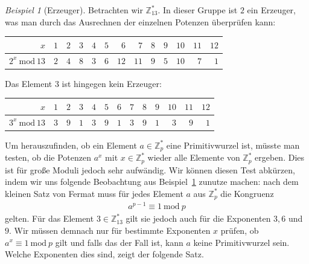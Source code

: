 \documentclass[
  a4paper,
  11pt,
]{scrartcl}
\theoremstyle{plain}
\theoremstyle{definition}
\theoremstyle{remark}
\newtheorem{beispiel}{Beispiel}
\newcommand{\Z}{\mathbb{Z}}
\newcommand{\Mod}[1]{\ \mathrm{mod}\ #1}
\begin{document}
\begin{beispiel}[Erzeuger]\label{bsp:erzeuger}
  Betrachten wir $\Z_{13}^*$. In dieser Gruppe ist $2$ ein Erzeuger, was man
  durch das Ausrechnen der einzelnen Potenzen überprüfen kann:
  \begin{center}
    \begin{tabular}{r*{12}{r}}
      \toprule
      $x$ & $1$ & $2$ & $3$ & $4$ & $5$ & $6$ & $7$ & $8$ & $9$ & $10$ & $11$ & $12$\\
      \midrule
      $2^x \Mod{13}$ & $2$ & $4$ & $8$ & $3$ & $6$ & $12$ & $11$ & $9$ & $5$ & $10$ & $7$ & $1$\\
      \bottomrule
    \end{tabular}
  \end{center}
  Das Element $3$ ist hingegen kein Erzeuger:
  \begin{center}
    \begin{tabular}{r*{12}{r}}
      \toprule
      $x$ & $1$ & $2$ & $3$ & $4$ & $5$ & $6$ & $7$ & $8$ & $9$ & $10$ & $11$ & $12$\\
      \midrule
      $3^x \Mod{13}$ & $3$ & $9$ & $1$ & $3$ & $9$ & $1$ & $3$ & $9$ & $1$ & $3$ & $9$ & $1$\\
      \bottomrule
    \end{tabular}
  \end{center}
\end{beispiel}

Um herauszufinden, ob ein Element $a \in \Z_p^*$ eine Primitivwurzel ist, müsste
man testen, ob die Potenzen $a^x$ mit $x \in \Z_p^*$ wieder alle Elemente von
$\Z_p^*$ ergeben. Dies ist für große Moduli jedoch sehr aufwändig. Wir können
diesen Test abkürzen, indem wir uns folgende Beobachtung aus
Beispiel~\ref{bsp:erzeuger} zunutze machen: nach dem kleinen Satz von Fermat
muss für jedes Element $a$ aus $\Z_p^*$ die Kongruenz
\begin{align*}
  a^{p-1} \equiv 1 \Mod{p}
\end{align*}
gelten. Für das Element $3 \in \Z_{13}^*$ gilt sie jedoch auch für die
Exponenten $3, 6$ und $9$. Wir müssen demnach nur für bestimmte Exponenten $x$
prüfen, ob $a^x \equiv 1 \Mod{p}$ gilt und falls das der Fall ist, kann $a$ keine
Primitivwurzel sein. Welche Exponenten dies sind, zeigt der folgende Satz.
\end{document}
